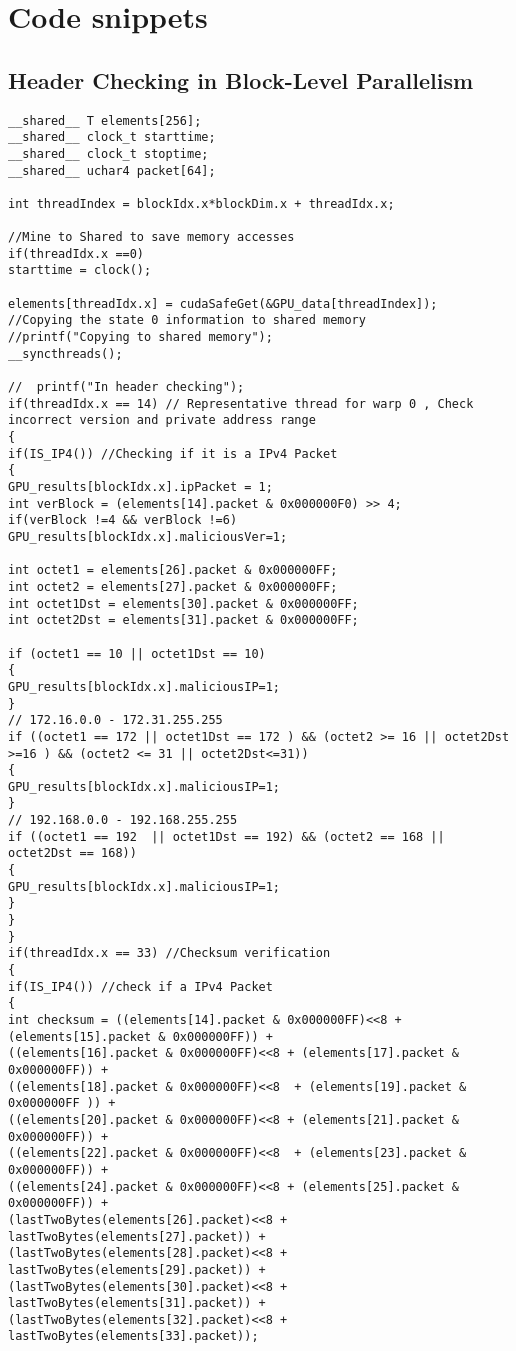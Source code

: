 \chapter{Code snippets\label{app:appa}}
\vspace{\topsep}
\section{Header Checking in Block-Level Parallelism}
\begin{lstlisting}
__shared__ T elements[256];
__shared__ clock_t starttime;
__shared__ clock_t stoptime;
__shared__ uchar4 packet[64];

int threadIndex = blockIdx.x*blockDim.x + threadIdx.x;

//Mine to Shared to save memory accesses
if(threadIdx.x ==0)
starttime = clock();

elements[threadIdx.x] = cudaSafeGet(&GPU_data[threadIndex]);
//Copying the state 0 information to shared memory
//printf("Copying to shared memory");
__syncthreads();

//	printf("In header checking");
if(threadIdx.x == 14) // Representative thread for warp 0 , Check incorrect version and private address range
{
if(IS_IP4()) //Checking if it is a IPv4 Packet
{
GPU_results[blockIdx.x].ipPacket = 1;
int verBlock = (elements[14].packet & 0x000000F0) >> 4;
if(verBlock !=4 && verBlock !=6) GPU_results[blockIdx.x].maliciousVer=1;

int octet1 = elements[26].packet & 0x000000FF;
int octet2 = elements[27].packet & 0x000000FF;
int octet1Dst = elements[30].packet & 0x000000FF;
int octet2Dst = elements[31].packet & 0x000000FF;

if (octet1 == 10 || octet1Dst == 10)
{
GPU_results[blockIdx.x].maliciousIP=1;
}
// 172.16.0.0 - 172.31.255.255
if ((octet1 == 172 || octet1Dst == 172 ) && (octet2 >= 16 || octet2Dst >=16 ) && (octet2 <= 31 || octet2Dst<=31))
{
GPU_results[blockIdx.x].maliciousIP=1;
}
// 192.168.0.0 - 192.168.255.255
if ((octet1 == 192  || octet1Dst == 192) && (octet2 == 168 || octet2Dst == 168))
{
GPU_results[blockIdx.x].maliciousIP=1;
}
}
}
if(threadIdx.x == 33) //Checksum verification
{
if(IS_IP4()) //check if a IPv4 Packet
{
int checksum = ((elements[14].packet & 0x000000FF)<<8 + (elements[15].packet & 0x000000FF)) +
((elements[16].packet & 0x000000FF)<<8 + (elements[17].packet & 0x000000FF)) +
((elements[18].packet & 0x000000FF)<<8  + (elements[19].packet & 0x000000FF )) +
((elements[20].packet & 0x000000FF)<<8 + (elements[21].packet & 0x000000FF)) +
((elements[22].packet & 0x000000FF)<<8  + (elements[23].packet & 0x000000FF)) +
((elements[24].packet & 0x000000FF)<<8 + (elements[25].packet & 0x000000FF)) +
(lastTwoBytes(elements[26].packet)<<8 + lastTwoBytes(elements[27].packet)) +
(lastTwoBytes(elements[28].packet)<<8 + lastTwoBytes(elements[29].packet)) +
(lastTwoBytes(elements[30].packet)<<8 + lastTwoBytes(elements[31].packet)) +
(lastTwoBytes(elements[32].packet)<<8 + lastTwoBytes(elements[33].packet));


\end{lstlisting}
